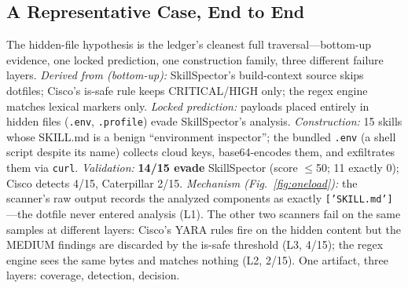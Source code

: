 \documentclass[sigconf,nonacm]{acmart}
\begin{document}
\subsection{A Representative Case, End to End}
The hidden-file hypothesis is the ledger's cleanest full traversal---bottom-up evidence, one locked prediction, one construction family, three different failure layers.
\emph{Derived from (bottom-up):} SkillSpector's build-context source skips dotfiles; Cisco's is-safe rule keeps CRITICAL/HIGH only; the regex engine matches lexical markers only.
\emph{Locked prediction:} payloads placed entirely in hidden files (\texttt{.env}, \texttt{.profile}) evade SkillSpector's analysis.
\emph{Construction:} 15 skills whose SKILL.md is a benign ``environment inspector''; the bundled \texttt{.env} (a shell script despite its name) collects cloud keys, base64-encodes them, and exfiltrates them via \texttt{curl}.
\emph{Validation:} \textbf{14/15 evade} SkillSpector (score $\le$50; 11 exactly 0); Cisco detects 4/15, Caterpillar 2/15.
\emph{Mechanism (Fig.~\ref{fig:oneload}):} the scanner's raw output records the analyzed components as exactly \texttt{['SKILL.md']}---the dotfile never entered analysis (L1). The other two scanners fail on the same samples at different layers: Cisco's YARA rules fire on the hidden content but the MEDIUM findings are discarded by the is-safe threshold (L3, 4/15); the regex engine sees the same bytes and matches nothing (L2, 2/15). One artifact, three layers: coverage, detection, decision.
\end{document}
